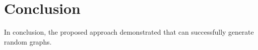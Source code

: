 \documentclass[conference]{IEEEtran}
\begin{document}
    
\section{Conclusion}

In conclusion, the proposed approach demonstrated that can successfully generate random graphs.

%
%
\end{document}
